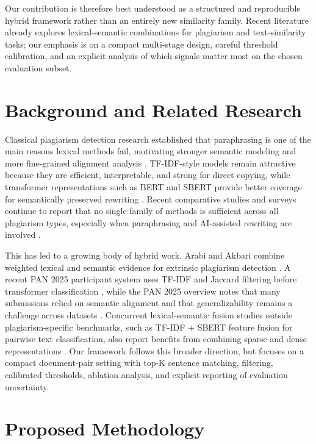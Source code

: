 \documentclass{llncs}
\begin{document}
Our contribution is therefore best understood as a structured and reproducible hybrid framework rather than an entirely new similarity family. Recent literature already explores lexical-semantic combinations for plagiarism and text-similarity tasks; our emphasis is on a compact multi-stage design, careful threshold calibration, and an explicit analysis of which signals matter most on the chosen evaluation subset.

\section{Background and Related Research}

Classical plagiarism detection research established that paraphrasing is one of the main reasons lexical methods fail, motivating stronger semantic modeling and more fine-grained alignment analysis \cite{barronacevedo2013,foltynek2019}. TF-IDF-style models remain attractive because they are efficient, interpretable, and strong for direct copying, while transformer representations such as BERT and SBERT provide better coverage for semantically preserved rewriting \cite{devlin2019,reimers2019}. Recent comparative studies and surveys continue to report that no single family of methods is sufficient across all plagiarism types, especially when paraphrasing and AI-assisted rewriting are involved \cite{amirg2025,sajid2025,pudasaini2024}.

This has led to a growing body of hybrid work. Arabi and Akbari combine weighted lexical and semantic evidence for extrinsic plagiarism detection \cite{arabi2022}. A recent PAN 2025 participant system uses TF-IDF and Jaccard filtering before transformer classification \cite{luo2025}, while the PAN 2025 overview notes that many submissions relied on semantic alignment and that generalizability remains a challenge across datasets \cite{greinerpetter2025}. Concurrent lexical-semantic fusion studies outside plagiarism-specific benchmarks, such as TF-IDF + SBERT feature fusion for pairwise text classification, also report benefits from combining sparse and dense representations \cite{mehdi2025}. Our framework follows this broader direction, but focuses on a compact document-pair setting with top-K sentence matching, filtering, calibrated thresholds, ablation analysis, and explicit reporting of evaluation uncertainty.

\section{Proposed Methodology}
\end{document}
